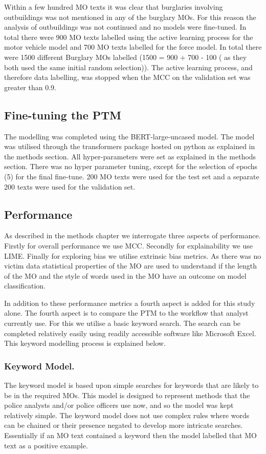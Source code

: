 Within a few hundred MO texts it was clear that burglaries involving outbuildings was not mentioned in any of the burglary MOs. For this reason the analysis of outbuildings was not continued and no models were fine-tuned. In total there were 900 MO texts labelled using the active learning process for the motor vehicle model and 700 MO texts labelled for the force model. In total there were 1500 different Burglary MOs labelled (1500 = 900 + 700 - 100 ( as they both used the same initial random selection)). The active learning process, and therefore data labelling, was stopped when the MCC on the validation set was greater than 0.9.

\subsection{Fine-tuning the PTM} The modelling was completed using the BERT-large-uncased model. The model was utilised through the transformers package hosted on python as explained in the methods section. All hyper-parameters were set as explained in the methods section. There was no hyper parameter tuning, except for the selection of epochs (5) for the final fine-tune. 200 MO texts were used for the test set and a separate 200 texts were used for the validation set.  

\subsection{Performance} As described in the methods chapter we interrogate three aspects of performance. Firstly for overall performance we use MCC. Secondly for explainability we use LIME. Finally for exploring bias we utilise extrinsic bias metrics. As there was no victim data statistical properties of the MO are used to understand if the length of the MO and the style of words used in the MO have an outcome on model classification. 

In addition to these performance metrics a fourth aspect is added for this study alone. The fourth aspect is to compare the PTM to the workflow that analyst currently use. For this we utilise a basic keyword search. The search can be completed relatively easily using readily accessible software like Microsoft Excel.  This keyword modelling process is explained below.

\subsubsection{Keyword Model.} The keyword model is based upon simple searches for keywords that are likely to be in the required MOs. This model is designed to represent methods that the police analysts and/or police officers use now, and so the model was kept relatively simple. The keyword model does not use complex rules where words can be chained or their presence negated to develop more intricate searches. Essentially if an MO text contained a keyword then the model labelled that MO text as a positive example. 

